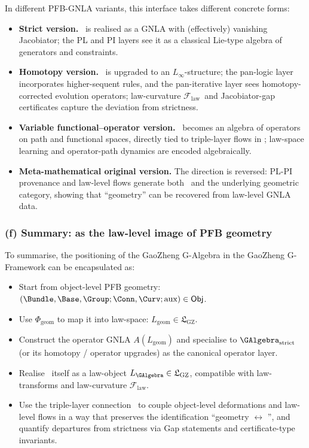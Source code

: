\documentclass[11pt]{book}
\theoremstyle{plain}
\theoremstyle{definition}
\newcommand{\GZLS}{\ensuremath{\mathfrak{L}_{\mathrm{GZ}}}}       \newcommand{\GZLT}{\ensuremath{M_{!w}}}                           \newcommand{\GZLOC}{\ensuremath{A_M}}                             \newcommand{\GZLCurv}{\ensuremath{\mathcal{F}_{\mathrm{law}}}}
\begin{document}
In different PFB-GNLA variants, this interface takes different
concrete forms:

\begin{itemize}
  \item \textbf{Strict version.}
        \GAlgebra\ is realised as a GNLA with (effectively) vanishing
        Jacobiator; the PL and PI layers see it as a classical
        Lie-type algebra of generators and constraints.
  \item \textbf{Homotopy version.}
        \GAlgebra\ is upgraded to an $L_\infty$-structure; the pan-logic
        layer incorporates higher-sequent rules, and the pan-iterative
        layer sees homotopy-corrected evolution operators; law-curvature
        \GZLCurv\ and Jacobiator-gap certificates capture the deviation
        from strictness.
  \item \textbf{Variable functional–operator version.}
        \GAlgebra\ becomes an algebra of operators on path and
        functional spaces, directly tied to triple-layer flows in
        \GZTLC; law-space learning and operator-path dynamics are
        encoded algebraically.
  \item \textbf{Meta-mathematical original version.}
        The direction is reversed: PL-PI provenance and law-level flows
        generate both \GAlgebra\ and the underlying geometric category,
        showing that “geometry” can be recovered from law-level GNLA
        data.
\end{itemize}



\subsubsection*{(f) Summary: \GAlgebra as the law-level image of PFB geometry}

To summarise, the positioning of the GaoZheng G-Algebra in the
GaoZheng G-Framework can be encapsulated as:

\begin{itemize}
  \item Start from object-level PFB geometry:
        $(\Bundle,\Base,\Group;\Conn,\Curv;\text{aux})\in\mathsf{Obj}$.
  \item Use $\Phi_{\mathrm{geom}}$ to map it into law-space:
        $L_{\mathrm{geom}}\in\GZLS$.
  \item Construct the operator GNLA $A(L_{\mathrm{geom}})$ and
        specialise to $\GAlgebra_{\mathrm{strict}}$ (or its homotopy /
        operator upgrades) as the canonical operator layer.
  \item Realise \GAlgebra\ itself as a law-object
        $L_{\GAlgebra}\in\GZLS$, compatible with law-transforms and
        law-curvature \GZLCurv.
  \item Use the triple-layer connection \GZTLC\ to couple object-level
        deformations and law-level flows in a way that preserves the
        identification “geometry $\leftrightarrow$ \GAlgebra”, and
        quantify departures from strictness via Gap statements and
        certificate-type invariants.
\end{itemize}
\end{document}
